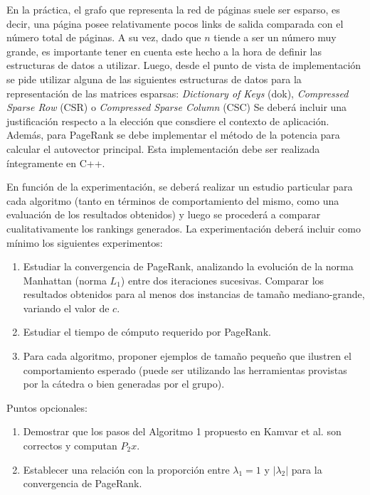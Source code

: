 En la pr\'actica, el grafo que representa la red de p\'aginas suele ser esparso, es decir, una p\'agina posee relativamente pocos links de salida comparada 
con el n\'umero total de p\'aginas. A su vez, dado que $n$ tiende a ser un n\'umero muy grande, es importante tener en cuenta este hecho a la hora de definir 
las estructuras de datos a utilizar. Luego, desde el punto de vista de implementaci\'on se pide utilizar alguna de las siguientes estructuras de datos para 
la representaci\'on de las matrices esparsas: \emph{Dictionary of Keys} (dok),
\emph{Compressed Sparse Row} (CSR) o \emph{Compressed Sparse Column}
(CSC)\label{apx:sparse_matrix}
Se deber\'a incluir una justificaci\'on respecto a la elecci\'on que consdiere el contexto de aplicaci\'on. Adem\'as, para PageRank se debe implementar el 
m\'etodo de la potencia para calcular el autovector principal. Esta implementaci\'on debe ser realizada \'integramente en \textsc{C++}.

En funci\'on de la experimentaci\'on, se deber\'a realizar un estudio particular para cada algoritmo (tanto en t\'erminos de comportamiento
del mismo, como una evaluaci\'on de los resultados obtenidos) y luego se proceder\'a a comparar cualitativamente los rankings generados.
La experimentaci\'on deber\'a incluir como m\'inimo los siguientes experimentos:
\begin{enumerate}
\item Estudiar la convergencia de PageRank, analizando la evoluci\'on de la norma Manhattan (norma $L_1$) entre dos iteraciones sucesivas. Comparar los 
resultados obtenidos para al menos dos instancias de tama\~no mediano-grande, variando el valor de $c$. 
\item Estudiar el tiempo de c\'omputo requerido por PageRank. 
\item Para cada algoritmo, proponer ejemplos de tama\~no peque\~no que ilustren el comportamiento esperado (puede ser utilizando las herramientas provistas
por la c\'atedra o bien generadas por el grupo).
\end{enumerate}

Puntos opcionales:
\begin{enumerate}
\item Demostrar que los pasos del Algoritmo 1 propuesto en Kamvar et al. \cite{Kamvar2003} son correctos y computan $P_2 x$.
\item Establecer una relaci\'on con la proporci\'on entre $\lambda_1 = 1$ y $|\lambda_2|$ para la convergencia de PageRank.
\end{enumerate}

